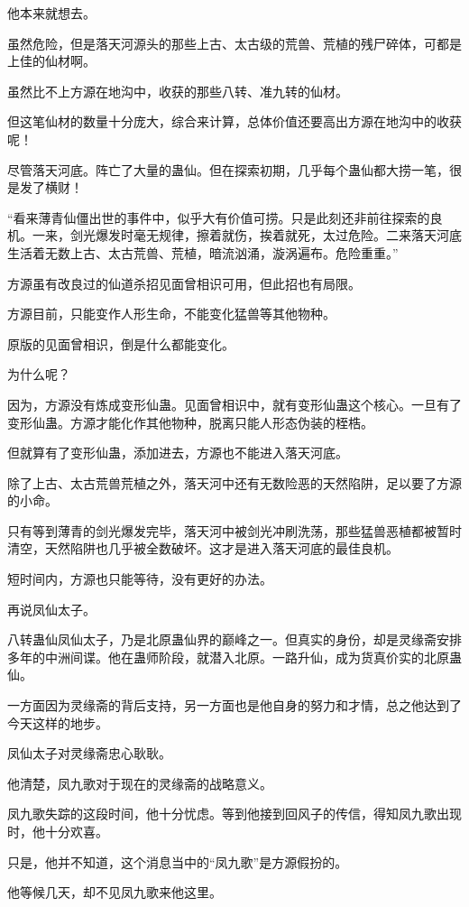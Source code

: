 \begin{this_body}
他本来就想去。

虽然危险，但是落天河源头的那些上古、太古级的荒兽、荒植的残尸碎体，可都是上佳的仙材啊。

虽然比不上方源在地沟中，收获的那些八转、准九转的仙材。

但这笔仙材的数量十分庞大，综合来计算，总体价值还要高出方源在地沟中的收获呢！

尽管落天河底。阵亡了大量的蛊仙。但在探索初期，几乎每个蛊仙都大捞一笔，很是发了横财！

“看来薄青仙僵出世的事件中，似乎大有价值可捞。只是此刻还非前往探索的良机。一来，剑光爆发时毫无规律，擦着就伤，挨着就死，太过危险。二来落天河底生活着无数上古、太古荒兽、荒植，暗流汹涌，漩涡遍布。危险重重。”

方源虽有改良过的仙道杀招见面曾相识可用，但此招也有局限。

方源目前，只能变作人形生命，不能变化猛兽等其他物种。

原版的见面曾相识，倒是什么都能变化。

为什么呢？

因为，方源没有炼成变形仙蛊。见面曾相识中，就有变形仙蛊这个核心。一旦有了变形仙蛊。方源才能化作其他物种，脱离只能人形态伪装的桎梏。

但就算有了变形仙蛊，添加进去，方源也不能进入落天河底。

除了上古、太古荒兽荒植之外，落天河中还有无数险恶的天然陷阱，足以要了方源的小命。

只有等到薄青的剑光爆发完毕，落天河中被剑光冲刷洗荡，那些猛兽恶植都被暂时清空，天然陷阱也几乎被全数破坏。这才是进入落天河底的最佳良机。

短时间内，方源也只能等待，没有更好的办法。

再说凤仙太子。

八转蛊仙凤仙太子，乃是北原蛊仙界的巅峰之一。但真实的身份，却是灵缘斋安排多年的中洲间谍。他在蛊师阶段，就潜入北原。一路升仙，成为货真价实的北原蛊仙。

一方面因为灵缘斋的背后支持，另一方面也是他自身的努力和才情，总之他达到了今天这样的地步。

凤仙太子对灵缘斋忠心耿耿。

他清楚，凤九歌对于现在的灵缘斋的战略意义。

凤九歌失踪的这段时间，他十分忧虑。等到他接到回风子的传信，得知凤九歌出现时，他十分欢喜。

只是，他并不知道，这个消息当中的“凤九歌”是方源假扮的。

他等候几天，却不见凤九歌来他这里。


\end{this_body}
